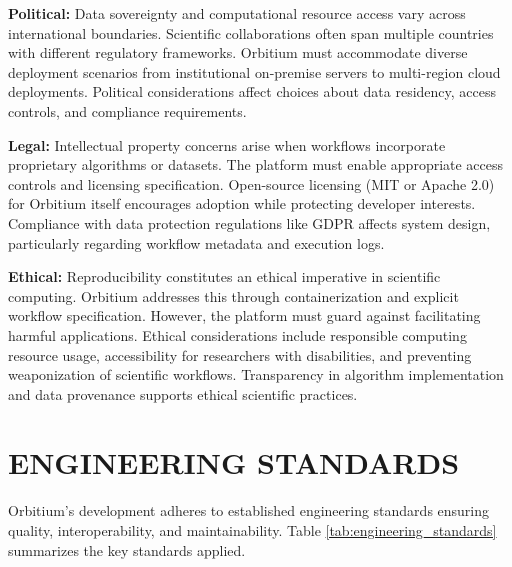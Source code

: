 \documentclass[12pt]{article}
\begin{document}
\hspace{\parindent}\textbf{Political:} Data sovereignty and computational resource access vary across international boundaries. Scientific collaborations often span multiple countries with different regulatory frameworks. Orbitium must accommodate diverse deployment scenarios from institutional on-premise servers to multi-region cloud deployments. Political considerations affect choices about data residency, access controls, and compliance requirements.

\hspace{\parindent}\textbf{Legal:} Intellectual property concerns arise when workflows incorporate proprietary algorithms or datasets. The platform must enable appropriate access controls and licensing specification. Open-source licensing (MIT or Apache 2.0) for Orbitium itself encourages adoption while protecting developer interests. Compliance with data protection regulations like GDPR affects system design, particularly regarding workflow metadata and execution logs.

\hspace{\parindent}\textbf{Ethical:} Reproducibility constitutes an ethical imperative in scientific computing. Orbitium addresses this through containerization and explicit workflow specification. However, the platform must guard against facilitating harmful applications. Ethical considerations include responsible computing resource usage, accessibility for researchers with disabilities, and preventing weaponization of scientific workflows. Transparency in algorithm implementation and data provenance supports ethical scientific practices.

\newpage
\section{ENGINEERING STANDARDS}

\hspace{\parindent}Orbitium's development adheres to established engineering standards ensuring quality, interoperability, and maintainability. Table \ref{tab:engineering_standards} summarizes the key standards applied.
\end{document}
